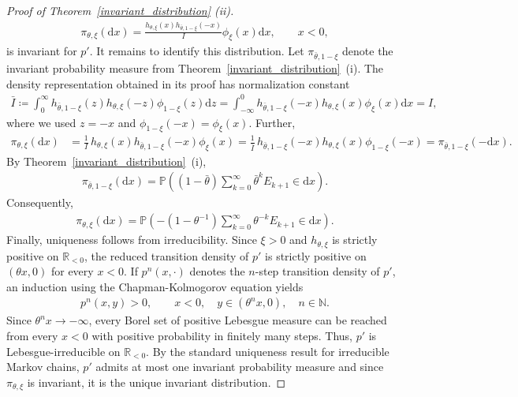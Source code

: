 \documentclass[10pt,a4paper]{amsart}
\newcommand{\N}{\mathbb{N}} %
\newcommand{\R}{\mathbb{R}} %
\renewcommand{\P}{\mathbb{P}} %
\newcommand{\1}{\mathds{1}}
\renewcommand{\d}{\mathrm{d}}
\begin{document}
\begin{proof}[Proof of Theorem~\ref{invariant_distribution} (ii)]
\begin{align*} 
    \pi_{\theta,\xi} (\d x) = \frac{ h_{\theta,\xi}(x) h_{\bar\theta,1-\xi}(-x) }{ I  } \phi_\xi( x)\d x, \qquad x<0,
\end{align*} 
is invariant for $p'$. It remains to identify this distribution. Let $\pi_{\bar\theta,1-\xi}$ denote the invariant probability measure from Theorem~\ref{invariant_distribution}~(i). The density representation
obtained in its proof has normalization constant
\begin{align*}
    \bar I
    \coloneqq\int_0^\infty h_{\bar\theta,1-\xi}(z)h_{\theta,\xi}(-z)\phi_{1-\xi}(z)\d z
    =\int_{-\infty}^0h_{\bar\theta,1-\xi}(-x)h_{\theta,\xi}(x)\phi_\xi(x)\d x
    =I,
\end{align*}
where we used $z=-x$ and
$\phi_{1-\xi}(-x)=\phi_\xi(x)$. %
Further,
\begin{align*}
    \pi_{\theta,\xi}(\d x) 
    &=\frac{1}{I}\, h_{\theta,\xi}(x)h_{\bar\theta,1-\xi}(-x)\phi_\xi(x) 
    =\frac{1}{\bar I} \, h_{\bar\theta,1-\xi}(-x)h_{\theta,\xi}(x)\phi_{1-\xi}(-x)
    =\pi_{\bar\theta,1-\xi}(-\d x).
\end{align*}
By Theorem~\ref{invariant_distribution}~(i),
\begin{align*}
    \pi_{\bar\theta,1-\xi}(\d x)
    =
    \P\left(
        (1-\bar\theta)
        \sum_{k=0}^\infty\bar\theta^kE_{k+1}
        \in\d x
    \right).
\end{align*}
Consequently,
\begin{align*}
    \pi_{\theta,\xi}(\d x)
    =
    \P\left(
        -(1-\theta^{-1})
        \sum_{k=0}^\infty\theta^{-k}E_{k+1}
        \in\d x
    \right).
\end{align*}
Finally, uniqueness follows from irreducibility. Since $\xi>0$ and $h_{\theta,\xi}$ is strictly positive on $\R_{<0}$, the reduced transition density of $p'$ is strictly positive on $(\theta x,0)$ for every $x<0$. If $p^n(x,\cdot)$ denotes the $n$-step transition density of $p'$, an induction using the Chapman-Kolmogorov equation yields
\begin{align*}
p^n(x,y)>0,\qquad x<0,\quad y\in(\theta^n x,0),\quad n\in\N.
\end{align*}
Since $\theta^n x\to-\infty$, every Borel set of positive Lebesgue measure can be reached from every $x<0$ with positive probability in finitely many steps. Thus, $p'$ is Lebesgue-irreducible on $\R_{<0}$. By the standard uniqueness result for irreducible Markov chains, $p'$ admits at most one invariant probability measure and since $\pi_{\theta,\xi}$ is invariant, it is the unique invariant distribution.
\end{proof}
\end{document}
